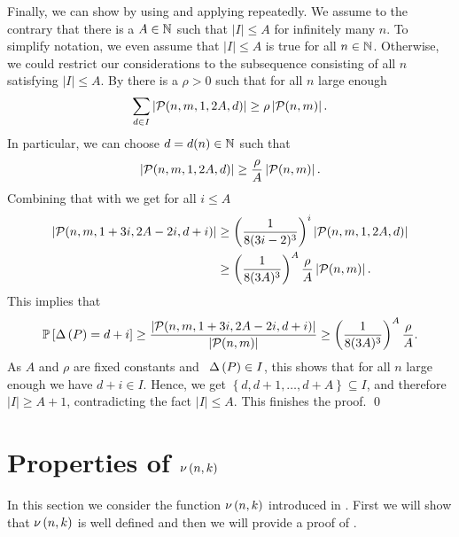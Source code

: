 Finally, we can show  by using  and applying  repeatedly.
We assume to the contrary that there is a $A\in\mathbb{N}$ such that $\left|I\right|\leq A$ for infinitely many $n$. To simplify notation, we even assume that $\left|I\right|\leq A$ is true for all $n\in\mathbb{N}$. Otherwise, we could restrict our considerations to the subsequence consisting of all $n$ satisfying $\left|I\right|\leq A$. By  there is a $\rho>0$ such that for all $n$ large enough
\begin{align*}
\sum_{d\in I}\left|\mathcal{P}(n,m,1,2A,d)\right|\geq \rho \left|\mathcal{P}(n,m)\right|.
\end{align*}
In particular, we can choose $d=d(n)\in\mathbb{N}$ such that 
\begin{align*}
\left|\mathcal{P}(n,m,1,2A,d)\right|\geq \frac{\rho}{A} \left|\mathcal{P}(n,m)\right|.
\end{align*}
Combining that with  we get for all $i\leq A$
\begin{align*}
\left|\mathcal{P}(n,m,1+3i,2A-2i,d+i)\right|&\geq \left(\frac{1}{8(3i-2)^3}\right)^i \left|\mathcal{P}(n,m,1,2A,d)\right|
\\
&\geq \left(\frac{1}{8(3A)^3}\right)^A\frac{\rho}{A}\left|\mathcal{P}(n,m)\right|.
\end{align*}
This implies that 
\begin{align*}
\mathbb{P}\left[\Delta\left(P\right)=d+i\right]\geq \frac{\left|\mathcal{P}(n,m,1+3i,2A-2i,d+i)\right|}{\left|\mathcal{P}(n,m)\right|}\geq \left(\frac{1}{8(3A)^3}\right)^A\frac{\rho}{A}.
\end{align*}
As $A$ and $\rho$ are fixed constants and \whp\ $\Delta\left(P\right)\in I$, this shows that for all $n$ large enough we have $d+i\in I$. Hence, we get $\left\{d, d+1, \ldots, d+A\right\}\subseteq I$, and therefore $|I|\geq A+1$, contradicting the fact $\left|I\right|\leq A$. This finishes the proof.
\qed

\section[Properties of \lq concentration-function\rq]{Properties of $\nu\left(n, k\right)$}\label{MDsec:nu}
In this section we consider the function $\nu\left(n, k\right)$ introduced in . First we will show that $\nu\left(n, k\right)$ is well defined and then we will provide a proof of .
